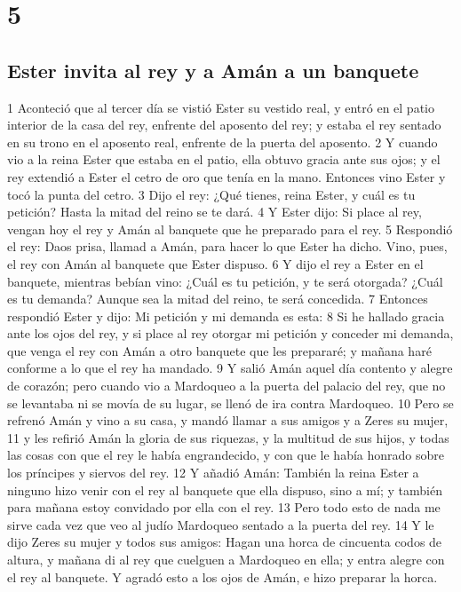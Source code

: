 \chapter{5}

\section*{Ester invita al rey y a Amán a un banquete}


1 Aconteció que al tercer día se vistió Ester su vestido real, y entró en el patio interior de la casa del rey, enfrente del aposento del rey; y estaba el rey sentado en su trono en el aposento real, enfrente de la puerta del aposento.
2 Y cuando vio a la reina Ester que estaba en el patio, ella obtuvo gracia ante sus ojos; y el rey extendió a Ester el cetro de oro que tenía en la mano. Entonces vino Ester y tocó la punta del cetro.
3 Dijo el rey: ¿Qué tienes, reina Ester, y cuál es tu petición? Hasta la mitad del reino se te dará.
4 Y Ester dijo: Si place al rey, vengan hoy el rey y Amán al banquete que he preparado para el rey.
5 Respondió el rey: Daos prisa, llamad a Amán, para hacer lo que Ester ha dicho. Vino, pues, el rey con Amán al banquete que Ester dispuso. 
6 Y dijo el rey a Ester en el banquete, mientras bebían vino: ¿Cuál es tu petición, y te será otorgada? ¿Cuál es tu demanda? Aunque sea la mitad del reino, te será concedida.
7 Entonces respondió Ester y dijo: Mi petición y mi demanda es esta:
8 Si he hallado gracia ante los ojos del rey, y si place al rey otorgar mi petición y conceder mi demanda, que venga el rey con Amán a otro banquete que les prepararé; y mañana haré conforme a lo que el rey ha mandado.
9 Y salió Amán aquel día contento y alegre de corazón; pero cuando vio a Mardoqueo a la puerta del palacio del rey, que no se levantaba ni se movía de su lugar, se llenó de ira contra Mardoqueo.
10 Pero se refrenó Amán y vino a su casa, y mandó llamar a sus amigos y a Zeres su mujer,
11 y les refirió Amán la gloria de sus riquezas, y la multitud de sus hijos, y todas las cosas con que el rey le había engrandecido, y con que le había honrado sobre los príncipes y siervos del rey.
12 Y añadió Amán: También la reina Ester a ninguno hizo venir con el rey al banquete que ella dispuso, sino a mí; y también para mañana estoy convidado por ella con el rey.
13 Pero todo esto de nada me sirve cada vez que veo al judío Mardoqueo sentado a la puerta del rey.
14 Y le dijo Zeres su mujer y todos sus amigos: Hagan una horca de cincuenta codos   de altura, y mañana di al rey que cuelguen a Mardoqueo en ella; y entra alegre con el rey al banquete. Y agradó esto a los ojos de Amán, e hizo preparar la horca.

